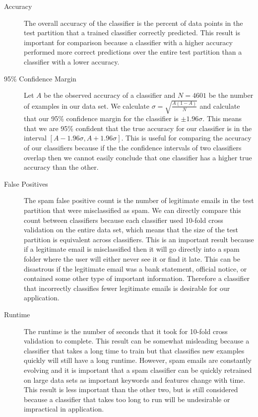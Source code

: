 \documentclass[11pt,oneside,reqno]{amsart}
\theoremstyle{definition}
\theoremstyle{definition}
\theoremstyle{remark}
\numberwithin{equation}{section}
\numberwithin{equation}{section}
\begin{document}
\begin{description}
	\item[Accuracy] The overall accuracy of the classifier is the percent of data points in the test partition that a trained classifier correctly predicted. This result is important for comparison because a classifier with a higher accuracy performed more correct predictions over the entire test partition than a classifier with a lower accuracy.
	\item[95\% Confidence Margin] Let \(A\) be the observed accuracy of a classifier and \(N=4601\) be the number of examples in our data set. We calculate \(\sigma = \sqrt{\frac{A(1-A)}{N}}\) and calculate that our 95\% confidence margin for the classifier is \(\pm 1.96 \sigma\). This means that we are 95\% confident that the true accuracy for our classifier is in the interval \([A-1.96\sigma, A+1.96\sigma]\). This is useful for comparing the accuracy of our classifiers because if the the confidence intervals of two classifiers overlap then we cannot easily conclude that one classifier has a higher true accuracy than the other.
	\item[False Positives] The spam false positive count is the number of legitimate emails in the test partition that were misclassified as spam. We can directly compare this count between classifiers because each classifier used 10-fold cross validation on the entire data set, which means that the size of the test partition is equivalent across classifiers. This is an important result because if a legitimate email is misclassified then it will go directly into a spam folder where the user will either never see it or find it late. This can be disastrous if the legitimate email was a bank statement, official notice, or contained some other type of important information. Therefore a classifier that incorrectly classifies fewer legitimate emails is desirable for our application.
	\item[Runtime] The runtime is the number of seconds that it took for 10-fold cross validation to complete. This result can be somewhat misleading because a classifier that takes a long time to train but that classifies new examples quickly will still have a long runtime. However, spam emails are constantly evolving and it is important that a spam classifier can be quickly retrained on large data sets as important keywords and features change with time. This result is less important than the other two, but is still considered because a classifier that takes too long to run will be undesirable or impractical in application.
\end{description}
\end{document}
